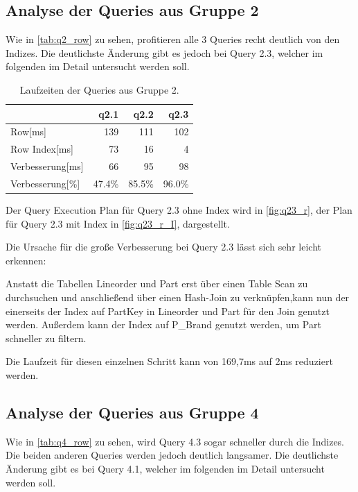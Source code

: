 \subsection{Analyse der Queries aus Gruppe 2}

Wie in \autoref{tab:q2_row} zu sehen, profitieren alle 3 Queries recht deutlich von den Indizes. 
Die deutlichste Änderung gibt es jedoch bei Query 2.3, welcher im folgenden im Detail untersucht werden soll.

\setlength\intextsep{0pt}
\begin{table}[H]
    \begin{tabularx}{\linewidth}{lrrr}
        \toprule
                        & q2.1  &	q2.2    &	q2.3 \\
        \toprule
        Row[ms]	        & 139	&	111	    &	102  \\
        Row Index[ms]   & 73	&   16	    &   4    \\
        Verbesserung[ms]  & 66    &   95      &   98   \\
        Verbesserung[\%]  & 47.4\%  &   85.5\%    &   96.0\% \\    
\bottomrule
\end{tabularx}
\caption{Laufzeiten der Queries aus Gruppe 2.}
\label{tab:q2_row}
\end{table}

Der Query Execution Plan für Query 2.3 ohne Index wird in \autoref{fig:q23_r}, der Plan für Query 2.3 mit Index in \autoref{fig:q23_r_I}, dargestellt.

Die Ursache für die große Verbesserung bei Query 2.3 lässt sich sehr leicht erkennen:

Anstatt die Tabellen Lineorder und Part erst über einen Table Scan zu durchsuchen und anschließend über einen Hash-Join zu verknüpfen,kann nun der einerseits der Index
auf PartKey in Lineorder und Part für den Join genutzt werden. Außerdem kann der Index auf P\_Brand genutzt werden, um Part schneller zu filtern. 

Die Laufzeit für diesen einzelnen Schritt kann von 169,7ms auf 2ms reduziert werden.


\subsection{Analyse der Queries aus Gruppe 4}

Wie in \autoref{tab:q4_row} zu sehen, wird Query 4.3 sogar schneller durch die Indizes. 
Die beiden anderen Queries werden jedoch deutlich langsamer. Die deutlichste Änderung 
gibt es bei Query 4.1, welcher im folgenden im Detail untersucht werden soll.

